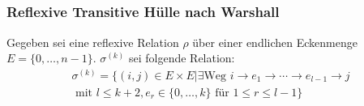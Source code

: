 \subsection*{}
\begin{frame}
	\frametitle{Reflexive Transitive Hülle nach Warshall}

	Gegeben sei eine reflexive Relation $\rho$ über einer endlichen Eckenmenge $E=\{0,\dots,n-1\}$.
	$\sigma^{(k)}$ sei folgende Relation:
	\begin{multline*}
		\sigma^{(k)} = \{(i,j)\in E \times E | \exists \text{Weg } i \to e_1 \to \cdots \to e_{l-1} \to j \\
		\text{ mit } l\le k+2, e_r\in\{0,\ldots,k\} \text{ für } 1\le r\le l-1\}
	\end{multline*}

	\begin{columns}
\end{columns}
\end{frame}
